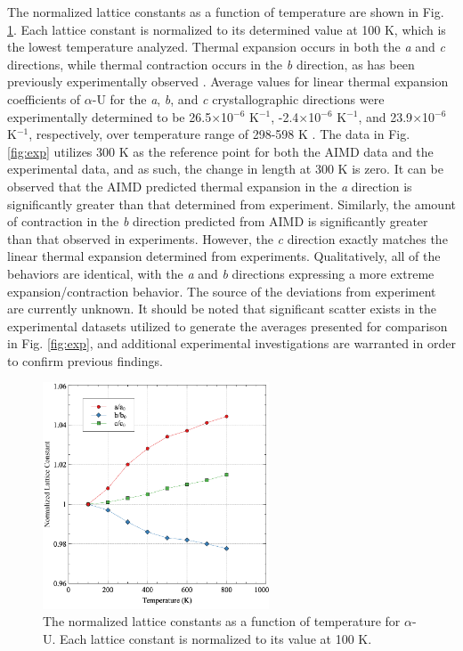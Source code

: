 \documentclass[review]{elsarticle}
\begin{document}
The normalized lattice constants as a function of temperature are shown in Fig. \ref{fig:a0}. Each lattice constant is normalized to its determined value at 100 K, which is the lowest temperature analyzed. Thermal expansion occurs in both the \textit{a} and \textit{c} directions, while thermal contraction occurs in the \textit{b} direction, as has been previously experimentally observed \cite{grenthe2010}. Average values for linear thermal expansion coefficients of $\alpha$-U for the \textit{a}, \textit{b}, and \textit{c} crystallographic directions were experimentally determined to be 26.5$\times$10$^{-6}$ K$^{-1}$, -2.4$\times$10$^{-6}$ K$^{-1}$, and 23.9$\times$10$^{-6}$ K$^{-1}$, respectively, over temperature range of 298-598 K \cite{grenthe2010, lloyd1966}. The data in Fig. \ref{fig:exp} utilizes 300 K as the reference point for both the AIMD data and the experimental data, and as such, the change in length at 300 K is zero. It can be observed that the AIMD predicted thermal expansion in the \textit{a} direction is significantly greater than that determined from experiment. Similarly, the amount of contraction in the \textit{b} direction predicted from AIMD is significantly greater than that observed in experiments. However, the \textit{c} direction exactly matches the linear thermal expansion determined from experiments. Qualitatively, all of the behaviors are identical, with the \textit{a} and \textit{b} directions expressing a more extreme expansion/contraction behavior. The source of the deviations from experiment are currently unknown. It should be noted that significant scatter exists in the experimental datasets utilized to generate the averages presented for comparison in Fig. \ref{fig:exp}, and additional experimental investigations are warranted in order to confirm previous findings.

 \begin{figure}[hbt]
	\centering
	\includegraphics[width=0.6\textwidth]{fig1.png}
    \caption{The normalized lattice constants as a function of temperature for $\alpha$-U. Each lattice constant is normalized to its value at 100 K.}\label{fig:a0}
\end{figure}
\end{document}
